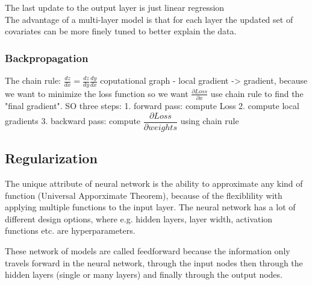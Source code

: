 The last update to the output layer is just linear regression\\
The advantage of a multi-layer model is that for each layer the updated set of covariates can be more finely tuned to better explain the data. 

\subsubsection{Backpropagation}
The chain rule: $\frac{dz}{dx}= \frac{dz}{dy} \frac{dy}{dx}$
coputational graph - local gradient -> gradient, because we want to minimize the loss function
so we want $\frac{\partial Loss}{\partial x}$ use chain rule to find the "final gradient".
SO three steps:
1. forward pass: compute Loss
2. compute local gradients
3. backward pass: compute $\dfrac{\partial Loss}{\partial weights}$ using chain rule

\subsection{Regularization}
The unique attribute of neural network is the ability to approximate any kind of function (Universal Apporximate Theorem), because of the flexiblility with applying multiple functions to the input layer. The neural network has a lot of different design options, where e.g. hidden layers, layer width, activation functions etc. are hyperparameters.



These network of models are called feedforward because the information only travels forward in the neural network, through the input nodes then through the hidden layers (single or many layers) and finally through the output nodes. 

